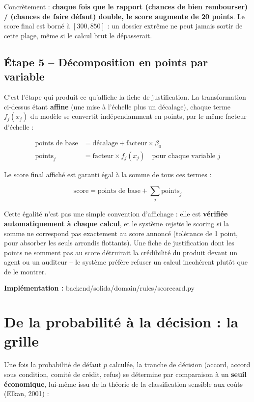 \documentclass[11pt,a4paper]{article}
\newcommand{\fichier}[1]{\noindent\textbf{Implémentation :} \tiny\ttfamily#1\normalfont\normalsize\par}
\begin{document}
Concrètement : \textbf{chaque fois que le rapport (chances de bien rembourser) / (chances de faire
défaut) double, le score augmente de 20 points}. Le score final est borné à $[300, 850]$ : un
dossier extrême ne peut jamais sortir de cette plage, même si le calcul brut le dépasserait.

\subsection{Étape 5 -- Décomposition en points par variable}

C'est l'étape qui produit ce qu'affiche la fiche de justification. La transformation ci-dessus
étant \textbf{affine} (une mise à l'échelle plus un décalage), chaque terme $f_j(x_j)$ du modèle
se convertit indépendamment en points, par le même facteur d'échelle :

\begin{align}
\text{points de base} &= \text{décalage} + \text{facteur} \times \beta_0 \\
\text{points}_j &= \text{facteur} \times f_j(x_j) \quad \text{pour chaque variable } j
\end{align}

Le score final affiché est garanti égal à la somme de tous ces termes :

\begin{equation}
\text{score} = \text{points de base} + \sum_j \text{points}_j
\end{equation}

Cette égalité n'est pas une simple convention d'affichage : elle est \textbf{vérifiée
automatiquement à chaque calcul}, et le système \emph{rejette} le scoring si la somme ne
correspond pas exactement au score annoncé (tolérance de 1 point, pour absorber les seuls
arrondis flottants). Une fiche de justification dont les points ne somment pas au score détruirait
la crédibilité du produit devant un agent ou un auditeur -- le système préfère refuser un calcul
incohérent plutôt que de le montrer.

\fichier{backend/solida/domain/rules/scorecard.py}

\section{De la probabilité à la décision : la grille}

Une fois la probabilité de défaut $p$ calculée, la tranche de décision (accord, accord sous
condition, comité de crédit, refus) se détermine par comparaison à un \textbf{seuil économique},
lui-même issu de la théorie de la classification sensible aux coûts (Elkan, 2001) :
\end{document}
